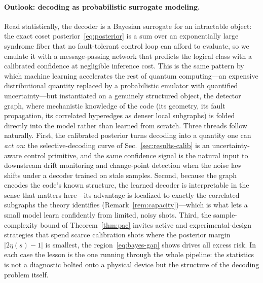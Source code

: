 \documentclass[aps,prxquantum,twocolumn,superscriptaddress,nofootinbib,longbibliography]{revtex4-2}
\begin{document}
\paragraph{Outlook: decoding as probabilistic surrogate modeling.}
Read statistically, the decoder is a Bayesian surrogate for an intractable object:
the exact coset posterior~\eqref{eq:posterior} is a sum over an exponentially large
syndrome fiber that no fault-tolerant control loop can afford to evaluate, so we
emulate it with a message-passing network that predicts the logical class with a
calibrated confidence at negligible inference cost. This is the same pattern by
which machine learning accelerates the rest of quantum computing---an expensive
distributional quantity replaced by a probabilistic emulator with quantified
uncertainty---but instantiated on a genuinely structured object, the detector
graph, where mechanistic knowledge of the code (its geometry, its fault
propagation, its correlated hyperedges as denser local subgraphs) is folded
directly into the model rather than learned from scratch. Three threads follow
naturally. First, the calibrated posterior turns decoding into a quantity one can
\emph{act on}: the selective-decoding curve of Sec.~\ref{sec:results-calib} is an
uncertainty-aware control primitive, and the same confidence signal is the natural
input to downstream drift monitoring and change-point detection when the noise law
shifts under a decoder trained on stale samples. Second, because the graph encodes
the code's known structure, the learned decoder is interpretable in the sense that
matters here---its advantage is localized to exactly the correlated subgraphs the
theory identifies (Remark~\ref{rem:capacity})---which is what lets a small model
learn confidently from limited, noisy shots. Third, the sample-complexity bound of
Theorem~\ref{thm:pac} invites active and experimental-design strategies that spend
scarce calibration shots where the posterior margin $|2\eta(s)-1|$ is smallest, the
region~\eqref{eq:bayes-gap} shows drives all excess risk. In each case the lesson
is the one running through the whole pipeline: the statistics is not a diagnostic
bolted onto a physical device but the structure of the decoding problem itself.
\end{document}
